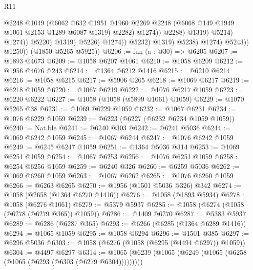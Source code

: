 \begin{lexlean}{R11}
\begin{coremodule}
                                              @2248
                                              @1049
                                              (@6062
                                                @632
                                                @1951
                                                @1960
                                                @2269
                                                @2248
                                                (@6068 @149 @1949 @1061 @2153 @1289 @6087 @1319)
                                                @2282)
                                              @1274))
                                          @2288)
                                        @1319)
                                      @5214)
                                    @1274))
                                @5220)
                              @1319)
                            @5226)
                          @1274))
                      @5232)
                    @1319)
                  @5238)
                @1274)
              @5243))
          @1250))
      (@1850 @5265 @5925))
@6206 := fun (a : @30) => @6205
@6207 := @1893 @4673
@6209 := @1058 @6207 @1061
@6210 := @1058 @6209
@6212 := @1956 @4676 @243
@6214 := @1364 @6212 @1416
@6215 := @6210 @6214
@6216 := @1058 @6215
@6217 := @5906 @265
@6218 := @1069 @6217
@6219 := @6218 @1059
@6220 := @1067 @6219
@6222 := @1076 @6217 @1059
@6223 := @6220 @6222
@6227 := @1058 (@1058 (@5899 @1061) @1059)
@6229 := @1070 @5265 @38
@6231 := @1069 @6229 @1059
@6232 := @1067 @6231
@6234 := @1076 @6229 @1059
@6239 := @6223 (@6227 (@6232 @6234 @1059 @1059))
@6240 := Nat.ble
@6241 := @6240 @303
@6242 := @6241 @5036
@6244 := @1069 @6242 @1059
@6245 := @1067 @6244
@6247 := @1076 @6242 @1059
@6249 := @6245 @6247 @1059
@6251 := @1364 @5036 @314
@6253 := @1069 @6251 @1059
@6254 := @1067 @6253
@6256 := @1076 @6251 @1059
@6258 := @6254 @6256 @1059
@6259 := @6240 @326
@6260 := @6259 @5036
@6262 := @1069 @6260 @1059
@6263 := @1067 @6262
@6265 := @1076 @6260 @1059
@6266 := @6263 @6265
@6270 := @1956 (@1501 @5036 @326) @342
@6274 := @1058 (@2658 (@1364 @6270 @1416))
@6276 := @1058 (@1893 @5934)
@6278 := @1058 (@6276 @1061)
@6279 := @5379 @5937
@6285 := @1058 (@6274 (@1058 (@6278 (@6279 @365)) @1059))
@6286 := @1409 @6270
@6287 := @5383 @5937
@6289 := @6286 (@6287 @365)
@6293 := @6266 (@6285 (@1364 @6289 @1416))
@6294 := @1065 @1059
@6295 := @1058 @6294
@6296 := @1501 @385
@6297 := @6296 @5036
@6303 := @1058 (@6276 (@1058 (@6295 (@4494 @6297)) @1059))
@6304 := @4497 @6297
@6314 := @1065 (@6239 (@1065 (@6249 (@1065 (@6258 (@1065 (@6293 (@6303 (@6279 @6304)))))))))

\end{coremodule}
\end{lexlean}
